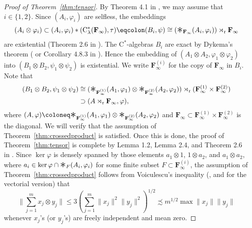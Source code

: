 \documentclass[12pt,nosumlimits,nonamelimits]{amsart}
\theoremstyle{remark}
\theoremstyle{definition}
\newcommand{\bF}{\mathbf{F}}
\newcommand{\vp}{\varphi}
\def\bigast{\font\bigsymbolsfont=cmsy10 scaled \magstep3
 \setbox0=\hbox{\bigsymbolsfont\char'003 }\mathord{\lower1pt\box0}}\relax\ignorespaces
\begin{document}
\begin{proof}[Proof of Theorem~\ref{thm:tensor}]
By Theorem 4.1 in \cite{robert}, we may assume that $i\in\{1,2\}$. 
Since $(A_i,\vp_i)$ are selfless, the embeddings 
\[
(A_i\otimes\vp_i) 
 \subset (A_i,\vp_i)\ast(\mathrm{C}^*_\lambda(\bF_\infty),\tau)
 \eqcolon (B_i,\psi) \cong (\bigast_{\bF_\infty} (A_i,\vp_i))\rtimes_{\mathrm{r}}\bF_\infty
\] 
are existential (Theorem 2.6 in \cite{robert}). 
The $\mathrm{C}^*$-alge\-bras $B_i$ are exact by Dykema's theorem (\cite{dykema} or Corollary 4.8.3 in \cite{bo}).
Hence the embedding of 
$(A_1\otimes A_2,\vp_1\otimes\vp_2) $ into $(B_1\otimes B_2,\psi_1\otimes\psi_2)$ 
is existential. 
We write $\bF_\infty^{(i)}$ for the copy of $\bF_\infty$ in $B_i$. 
Note that 
\begin{align*}
(B_1\otimes B_2,\psi_1\otimes\psi_2) 
 &\cong (\bigast_{\bF_\infty^{(1)}} (A_1,\vp_1) \otimes \bigast_{\bF_\infty^{(2)}} (A_2,\vp_2))\rtimes_{\mathrm{r}}(\bF_\infty^{(1)}\times\bF_\infty^{(2)})\\
 &\supset (A \rtimes_{\mathrm{r}}\bF_\infty,\vp),
\end{align*}
where $(A,\vp) \coloneq \bigast_{\bF_\infty^{(1)}} (A_1,\vp_1) \otimes \bigast_{\bF_\infty^{(2)}}(A_2,\vp_2)$ 
and 
$\bF_\infty\subset \bF_\infty^{(1)}\times\bF_\infty^{(2)}$ is the diagonal. 
We will verify that the assumption of Theorem~\ref{thm:crossedproduct} 
is satisfied. 
Once this is done, the proof of Theorem~\ref{thm:tensor} is complete by 
Lemma 1.2, Lemma 2.4, and Theorem 2.6 in \cite{robert}. 
Since $\ker\vp$ is densely spanned by those elements 
$a_1\otimes 1$, $1\otimes a_2$, and $a_1\otimes a_2$, 
where $a_i\in\ker\vp\cap \bigast_{F} (A_i,\vp_i)$ 
for some finite subset $F\subset \bF_\infty^{(i)}$,
the assumption of Theorem~\ref{thm:crossedproduct} follows from 
Voiculescu's inequality (\cite{voiculescu}, and \cite{junge} for the vectorial version) 
that 
\[
\| \sum_{j=1}^m x_j \otimes y_j \| \le 3(\sum_{j=1}^m \|x_j\|^2\|y_j\|^2)^{1/2} 
\precsim m^{1/2}\max \|x_j\|\|y_j\|
\]
whenever $x_j$'s (or $y_j$'s) are freely independent and mean zero. 
\end{proof}
%
\end{document}
